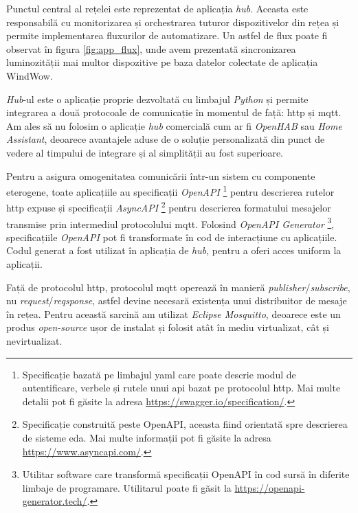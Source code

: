 Punctul central al rețelei este reprezentat de aplicația \textit{hub}. Aceasta este responsabilă cu monitorizarea și orchestrarea tuturor dispozitivelor din rețea și permite implementarea fluxurilor de automatizare. Un astfel de flux poate fi observat în figura \ref{fig:app_flux}, unde avem prezentată sincronizarea luminozității mai multor dispozitive pe baza datelor colectate de aplicația WindWow. 

\textit{Hub}-ul este o aplicație proprie dezvoltată cu limbajul \textit{Python} și permite integrarea a două protocoale de comunicație în momentul de față: \acrshort{http} și \acrshort{mqtt}. Am ales să nu folosim o aplicație \textit{hub} comercială cum ar fi \textit{OpenHAB} sau \textit{Home Assistant}, deoarece avantajele aduse de o soluție personalizată din punct de vedere al timpului de integrare și al simplității au fost superioare.

Pentru a asigura omogenitatea comunicării într-un sistem cu componente eterogene, toate aplicațiile au specificații \textit{OpenAPI} \footnote{Specificație bazată pe limbajul \acrshort{yaml} care poate descrie modul de autentificare, verbele și rutele unui \acrshort{api} bazat pe protocolul \acrshort{http}. Mai multe detalii pot fi găsite la adresa \url{https://swagger.io/specification/}.} pentru descrierea rutelor \acrshort{http} expuse și specificații \textit{AsyncAPI} \footnote{Specificație construită peste OpenAPI, aceasta fiind orientată spre descrierea de sisteme \acrshort{eda}. Mai multe informații pot fi găsite la adresa \url{https://www.asyncapi.com/}.} pentru descrierea formatului mesajelor transmise prin intermediul protocolului \acrshort{mqtt}. Folosind \textit{OpenAPI Generator} \footnote{Utilitar software care transformă specificații OpenAPI în cod sursă în diferite limbaje de programare. Utilitarul poate fi găsit la \url{https://openapi-generator.tech/}.}, specificațiile \textit{OpenAPI} pot fi transformate în cod de interacțiune cu aplicațiile. Codul generat a fost utilizat în aplicația de \textit{hub}, pentru a oferi acces uniform la aplicații.

Față de protocolul \acrshort{http}, protocolul \acrshort{mqtt} operează în manieră \textit{publisher}/\textit{subscribe}, nu \textit{request}/\textit{reqsponse}, astfel devine necesară existența unui distribuitor de mesaje în rețea. Pentru această sarcină am utilizat \textit{Eclipse Mosquitto}, deoarece este un produs \textit{open-source} ușor de instalat și folosit atât în mediu virtualizat, cât și nevirtualizat.


